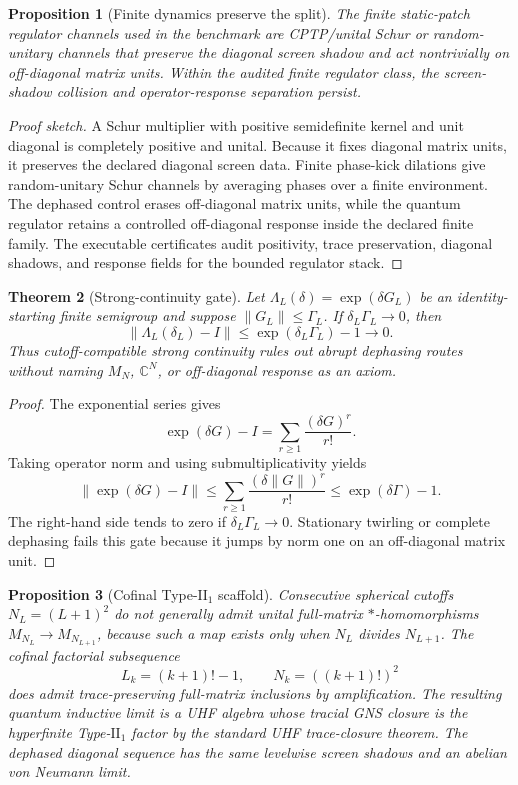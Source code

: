 \documentclass[11pt]{article}
\newtheorem{theorem}{Theorem}
\newtheorem{proposition}[theorem]{Proposition}
\begin{document}
\begin{proposition}[Finite dynamics preserve the split]
The finite static-patch regulator channels used in the benchmark are
CPTP/unital Schur or random-unitary channels that preserve the diagonal screen
shadow and act nontrivially on off-diagonal matrix units. Within the audited
finite regulator class, the screen-shadow collision and operator-response
separation persist.
\end{proposition}

\begin{proof}[Proof sketch]
A Schur multiplier with positive semidefinite kernel and unit diagonal is
completely positive and unital. Because it fixes diagonal matrix units, it
preserves the declared diagonal screen data. Finite phase-kick dilations give
random-unitary Schur channels by averaging phases over a finite environment.
The dephased control erases off-diagonal matrix units, while the quantum
regulator retains a controlled off-diagonal response inside the declared
finite family. The executable certificates audit positivity, trace
preservation, diagonal shadows, and response fields for the bounded regulator
stack.
\end{proof}

\begin{theorem}[Strong-continuity gate]
Let $\Lambda_L(\delta)=\exp(\delta G_L)$ be an identity-starting finite
semigroup and suppose $\|G_L\|\le \Gamma_L$. If
$\delta_L\Gamma_L\to0$, then
\[
  \|\Lambda_L(\delta_L)-I\|
  \le \exp(\delta_L\Gamma_L)-1\to0.
\]
Thus cutoff-compatible strong continuity rules out abrupt dephasing routes
without naming $M_N$, $\mathbb{C}^N$, or off-diagonal response as an axiom.
\end{theorem}

\begin{proof}
The exponential series gives
\[
  \exp(\delta G)-I=\sum_{r\ge1}\frac{(\delta G)^r}{r!}.
\]
Taking operator norm and using submultiplicativity yields
\[
  \|\exp(\delta G)-I\|
  \le \sum_{r\ge1}\frac{(\delta\|G\|)^r}{r!}
  \le \exp(\delta\Gamma)-1.
\]
The right-hand side tends to zero if $\delta_L\Gamma_L\to0$. Stationary
twirling or complete dephasing fails this gate because it jumps by norm one on
an off-diagonal matrix unit.
\end{proof}

\begin{proposition}[Cofinal Type-$\mathrm{II}_1$ scaffold]
Consecutive spherical cutoffs $N_L=(L+1)^2$ do not generally admit unital
full-matrix $*$-homomorphisms $M_{N_L}\to M_{N_{L+1}}$, because such a map
exists only when $N_L$ divides $N_{L+1}$. The cofinal factorial subsequence
\[
  L_k=(k+1)!-1,\qquad N_k=((k+1)!)^2
\]
does admit trace-preserving full-matrix inclusions by amplification. The
resulting quantum inductive limit is a UHF algebra whose tracial GNS closure
is the hyperfinite Type-$\mathrm{II}_1$ factor by the standard UHF
trace-closure theorem. The dephased diagonal sequence has the same levelwise
screen shadows and an abelian von Neumann limit.
\end{proposition}
\end{document}
